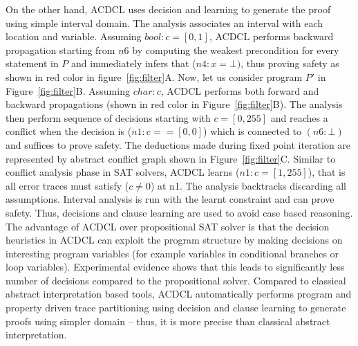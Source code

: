 On the other hand, ACDCL uses decision and learning to generate the proof 
using simple interval domain. The analysis associates an interval with each location and variable.  
Assuming $bool: c = [0,1]$, ACDCL performs backward propagation 
starting from $n6$ by computing the weakest precondition for every statement 
in $P$ and immediately infers that (\(n4: x = \bot)\), thus proving safety as shown in 
red color in figure~\ref{fig:filter}A.  Now, let us consider program $P'$ in
Figure~\ref{fig:filter}B. Assuming $char: c$, ACDCL performs both forward and
backward propagations (shown in red color in Figure~\ref{fig:filter}B).  
The analysis then perform sequence of decisions starting with $c = [0,255]$ and reaches a 
conflict when the decision is (\(n1:c == [0,0]\)) which is connected to $(n6: \bot)$ 
and suffices to prove safety.  The deductions made during fixed point
iteration are represented by abstract conflict graph shown in Figure~\ref{fig:filter}C. 
Similar to conflict analysis phase in SAT solvers, ACDCL learns (\(n1: c = [1,255]\)), 
that is all error traces must satisfy (\(c \neq 0\)) at n1.  The analysis backtracks 
discarding all assumptions. Interval analysis is run with the learnt constraint and 
can prove safety.  Thus, decisions and clause learning are used to avoid case based reasoning. 
The advantage of ACDCL over propositional SAT solver is that the decision heuristics in 
ACDCL can exploit the program structure by making decisions on interesting program 
variables (for example variables in conditional branches or loop variables). Experimental 
evidence shows that this leads to significantly less number of decisions compared 
to the propositional solver. Compared to classical abstract interpretation 
based tools, ACDCL automatically performs program and property driven trace partitioning 
using decision and clause learning to generate proofs using simpler domain -- thus, it is more 
precise than classical abstract interpretation.  
 
